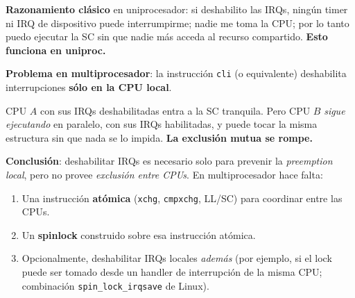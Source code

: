 \documentclass[11pt,a4paper]{article}
\begin{document}
\textbf{Razonamiento clásico} en uniprocesador: si deshabilito las
IRQs, ningún timer ni IRQ de dispositivo puede interrumpirme; nadie
me toma la CPU; por lo tanto puedo ejecutar la SC sin que nadie más
acceda al recurso compartido. \textbf{Esto funciona en uniproc.}

\textbf{Problema en multiprocesador}: la instrucción \texttt{cli} (o
equivalente) deshabilita interrupciones \textbf{sólo en la CPU
local}.

\begin{center}
\end{center}

CPU $A$ con sus IRQs deshabilitadas entra a la SC tranquila. Pero
CPU $B$ \emph{sigue ejecutando} en paralelo, con sus IRQs
habilitadas, y puede tocar la misma estructura sin que nada se lo
impida. \textbf{La exclusión mutua se rompe.}

\textbf{Conclusión}: deshabilitar IRQs es necesario solo para
prevenir la \emph{preemption local}, pero no provee \emph{exclusión
entre CPUs}. En multiprocesador hace falta:

\begin{enumerate}[leftmargin=*]
    \item Una instrucción \textbf{atómica} (\texttt{xchg},
        \texttt{cmpxchg}, LL/SC) para coordinar entre las CPUs.
    \item Un \textbf{spinlock} construido sobre esa instrucción
        atómica.
    \item Opcionalmente, deshabilitar IRQs locales \emph{además}
        (por ejemplo, si el lock puede ser tomado desde un handler
        de interrupción de la misma CPU; combinación
        \texttt{spin\_lock\_irqsave} de Linux).
\end{enumerate}
\end{document}
